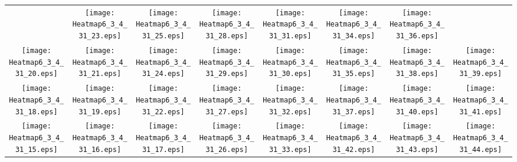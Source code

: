 \documentclass{standalone}
\begin{document}
\renewcommand{\arraystretch}{0}
\setlength{\tabcolsep}{0pt}
\begin{tabular}{ *8{c} }
 & \texttt{[image: Heatmap6\_3\_4\_31\_23.eps]} & \texttt{[image: Heatmap6\_3\_4\_31\_25.eps]} & \texttt{[image: Heatmap6\_3\_4\_31\_28.eps]} & \texttt{[image: Heatmap6\_3\_4\_31\_31.eps]} & \texttt{[image: Heatmap6\_3\_4\_31\_34.eps]} & \texttt{[image: Heatmap6\_3\_4\_31\_36.eps]} &  \\
\texttt{[image: Heatmap6\_3\_4\_31\_20.eps]} & \texttt{[image: Heatmap6\_3\_4\_31\_21.eps]} & \texttt{[image: Heatmap6\_3\_4\_31\_24.eps]} & \texttt{[image: Heatmap6\_3\_4\_31\_29.eps]} & \texttt{[image: Heatmap6\_3\_4\_31\_30.eps]} & \texttt{[image: Heatmap6\_3\_4\_31\_35.eps]} & \texttt{[image: Heatmap6\_3\_4\_31\_38.eps]} & \texttt{[image: Heatmap6\_3\_4\_31\_39.eps]} \\
\texttt{[image: Heatmap6\_3\_4\_31\_18.eps]} & \texttt{[image: Heatmap6\_3\_4\_31\_19.eps]} & \texttt{[image: Heatmap6\_3\_4\_31\_22.eps]} & \texttt{[image: Heatmap6\_3\_4\_31\_27.eps]} & \texttt{[image: Heatmap6\_3\_4\_31\_32.eps]} & \texttt{[image: Heatmap6\_3\_4\_31\_37.eps]} & \texttt{[image: Heatmap6\_3\_4\_31\_40.eps]} & \texttt{[image: Heatmap6\_3\_4\_31\_41.eps]} \\
\texttt{[image: Heatmap6\_3\_4\_31\_15.eps]} & \texttt{[image: Heatmap6\_3\_4\_31\_16.eps]} & \texttt{[image: Heatmap6\_3\_4\_31\_17.eps]} & \texttt{[image: Heatmap6\_3\_4\_31\_26.eps]} & \texttt{[image: Heatmap6\_3\_4\_31\_33.eps]} & \texttt{[image: Heatmap6\_3\_4\_31\_42.eps]} & \texttt{[image: Heatmap6\_3\_4\_31\_43.eps]} & \texttt{[image: Heatmap6\_3\_4\_31\_44.eps]} \\

\end{tabular}
\end{document}
